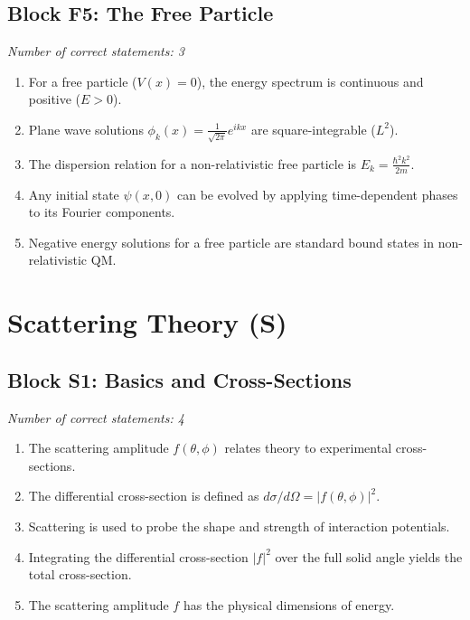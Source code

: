 \documentclass[a4paper,12pt]{article}
\begin{document}
\subsection*{Block F5: The Free Particle}
\textit{Number of correct statements: 3}
\begin{enumerate}[label=\roman*.]
    \item For a free particle ($V(x)=0$), the energy spectrum is continuous and positive ($E > 0$).
    \item Plane wave solutions $\phi_k(x) = \frac{1}{\sqrt{2\pi}}e^{ikx}$ are square-integrable ($L^2$).
    \item The dispersion relation for a non-relativistic free particle is $E_k = \frac{\hbar^2 k^2}{2m}$.
    \item Any initial state $\psi(x,0)$ can be evolved by applying time-dependent phases to its Fourier components.
    \item Negative energy solutions for a free particle are standard bound states in non-relativistic QM.
\end{enumerate}

\newpage

\section{Scattering Theory (S)}

\subsection*{Block S1: Basics and Cross-Sections}
\textit{Number of correct statements: 4}
\begin{enumerate}[label=\roman*.]
    \item The scattering amplitude $f(\theta, \phi)$ relates theory to experimental cross-sections.
    \item The differential cross-section is defined as $d\sigma/d\Omega = |f(\theta, \phi)|^2$.
    \item Scattering is used to probe the shape and strength of interaction potentials.
    \item Integrating the differential cross-section $|f|^2$ over the full solid angle yields the total cross-section.
    \item The scattering amplitude $f$ has the physical dimensions of energy.
\end{enumerate}
\end{document}
